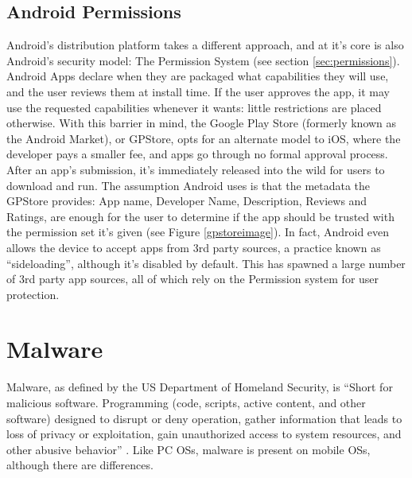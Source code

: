 \subsection{Android Permissions}
Android's distribution platform takes a different approach, and at it's core is also Android's security model: The Permission System (see section \ref{sec:permissions}). Android Apps declare when they are packaged what capabilities they will use, and the user reviews them at install time. If the user approves the app, it may use the requested capabilities whenever it wants: little restrictions are placed otherwise. With this barrier in mind, the Google Play Store (formerly known as the Android Market), or GPStore, opts for an alternate model to iOS, where the developer pays a smaller fee, and apps go through no formal approval process. After an app's submission, it's immediately released into the wild for users to download and run. The assumption Android uses is that the metadata the GPStore provides: App name, Developer Name, Description, Reviews and Ratings, are enough for the user to determine if the app should be trusted with the permission set it's given (see Figure \ref{gpstoreimage}). In fact, Android even allows the device to accept apps from 3rd party sources, a practice known as ``sideloading'', although it's disabled by default. This has spawned a large number of 3rd party app sources, all of which rely on the Permission system for user protection.



\section{Malware}
Malware, as defined by the US Department of Homeland Security, is ``Short for malicious software. Programming (code, scripts, active content, and other software) designed to disrupt or deny operation, gather information that leads to loss of privacy or exploitation, gain unauthorized access to system resources, and other abusive behavior'' \citep{nash2005undirected}. Like PC OSs, malware is present on mobile OSs, although there are differences.


